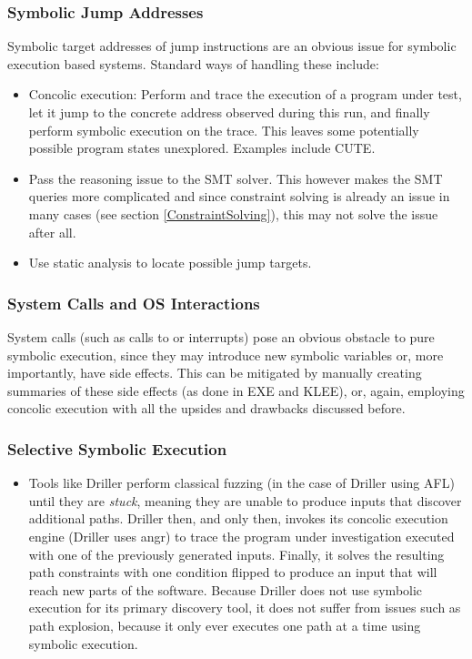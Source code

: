\documentclass{article}
\begin{document}
\begin{multicols}{2}
    \subsubsection{Symbolic Jump Addresses}
    Symbolic target addresses of jump instructions are an obvious issue for symbolic execution based systems. Standard ways of handling these include:
    \begin{itemize}
        \item Concolic execution: Perform and trace the execution of a program under test, let it jump to the concrete address observed during this run, and finally perform symbolic execution on the trace. This leaves some potentially possible program states unexplored. Examples include CUTE\cite{CUTE}.
        \item Pass the reasoning issue to the SMT solver. This however makes the SMT queries more complicated and since constraint solving is already an issue in many cases (see section \ref{ConstraintSolving}), this may not solve the issue after all.
        \item Use static analysis to locate possible jump targets.
    \end{itemize}

    \subsubsection{System Calls and OS Interactions}
    System calls (such as calls to  or interrupts) pose an obvious obstacle to pure symbolic execution, since they may introduce new symbolic variables or, more importantly, have side effects. This can be mitigated by manually creating summaries of these side effects (as done in EXE\cite{EXE} and KLEE\cite{KLEE}), or, again, employing concolic execution with all the upsides and drawbacks discussed before.

    \subsubsection{Selective Symbolic Execution}
    \begin{itemize}
        \item Tools like Driller\cite{Driller} perform classical fuzzing (in the case of Driller using AFL\cite{AFLPlusPlus}) until they are \textit{stuck}, meaning they are unable to produce inputs that discover additional paths. Driller then, and only then, invokes its concolic execution engine (Driller uses angr\cite{angr}) to trace the program under investigation executed with one of the previously generated inputs. Finally, it solves the resulting path constraints with one condition flipped to produce an input that will reach new parts of the software. Because Driller does not use symbolic execution for its primary discovery tool, it does not suffer from issues such as path explosion, because it only ever executes one path at a time using symbolic execution.
    \end{itemize}


\end{multicols}
\end{document}
